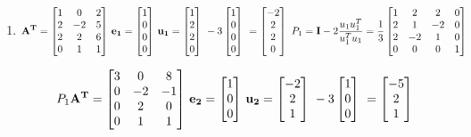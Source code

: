 \documentclass[english,onecolumn]{IEEEtran}
\begin{document}
\begin{enumerate}
	\item  \[
	{\bf A^T}=
	\begin{bmatrix}
		1&0&2\\
		2&-2&5\\
		2&2&6\\
		0&1&1
	\end{bmatrix}\,
	{\bf e_1}=
	\begin{bmatrix}
		1\\
		0\\
		0\\
		0
	\end{bmatrix}\,
	{\bf u_1}=
	\begin{bmatrix}
		1\\
		2\\
		2\\
		0
	\end{bmatrix}\
	-3
	\begin{bmatrix}
		1\\
		0\\
		0\\
		0
	\end{bmatrix}\
	=
	\begin{bmatrix}
		-2\\
		2\\
		2\\
		0
	\end{bmatrix}\
	P_1 = \textbf{I} - 2 \frac{u_1 u_1^T}{u_1^T u_1}
	=\frac{1}{3}
	\begin{bmatrix}
		1&2&2&0\\
		2&1&-2&0\\
		2&-2&1&0\\
		0&0&0&1
	\end{bmatrix}\,
	\]
	
	 \[
	{P_1\bf A^T}=
	\begin{bmatrix}
		3&0&8\\
		0&-2&-1\\
		0&2&0\\
		0&1&1
	\end{bmatrix}\,
	{\bf e_2}=
	\begin{bmatrix}
		1\\
		0\\
		0
	\end{bmatrix}\,
	{\bf u_2}=
	\begin{bmatrix}
		-2\\
		2\\
		1
	\end{bmatrix}\
	-3
	\begin{bmatrix}
		1\\
		0\\
		0
	\end{bmatrix}\
	=
	\begin{bmatrix}
		-5\\
		2\\
		1
	\end{bmatrix}\]


\end{enumerate}
\end{document}
